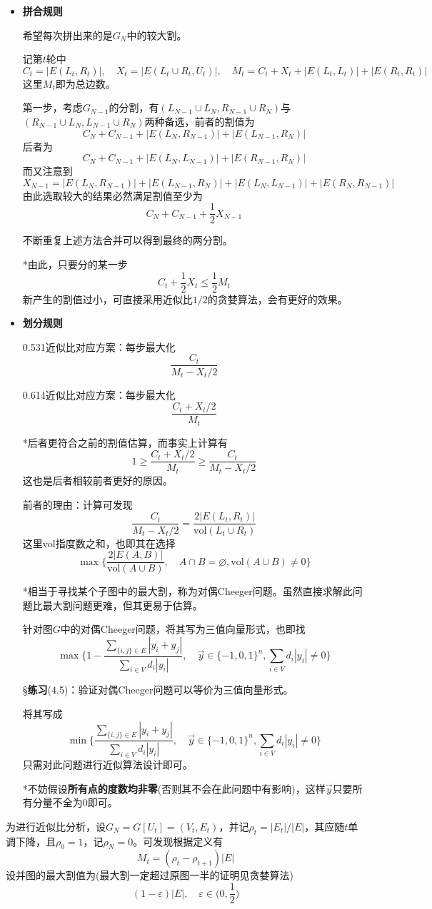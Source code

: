 \documentclass[a4paper,UTF8,fontset=windows]{ctexart}
\newcommand{\exce}[2]{\S\textbf{练习}(#1)：{\kaishu #2}}
\begin{document}
\begin{itemize}
    \item \textbf{拼合规则}
    
    希望每次拼出来的是$G_N$中的较大割。
    
    记第$t$轮中
    $$C_t=|E(L_t,R_t)|,\quad X_t=|E(L_t\cup R_t,U_t)|,\quad M_t=C_t+X_t+|E(L_t,L_t)|+|E(R_t,R_t)|$$
    这里$M_t$即为总边数。

    第一步，考虑$G_{N-1}$的分割，有$(L_{N-1}\cup L_N,R_{N-1}\cup R_N)$与$(R_{N-1}\cup L_N,L_{N-1}\cup R_N)$两种备选，前者的割值为
    $$C_N+C_{N-1}+|E(L_N,R_{N-1})|+|E(L_{N-1},R_N)|$$
    后者为
    $$C_N+C_{N-1}+|E(L_N,L_{N-1})|+|E(R_{N-1},R_N)|$$
    而又注意到
    $$X_{N-1}=|E(L_N,R_{N-1})|+|E(L_{N-1},R_N)|+|E(L_N,L_{N-1})|+|E(R_N,R_{N-1})|$$
    由此选取较大的结果必然满足割值至少为
    $$C_N+C_{N-1}+\frac{1}{2}X_{N-1}$$

    不断重复上述方法合并可以得到最终的两分割。

    *由此，只要分的某一步
    $$C_t+\frac{1}{2}X_t\le\frac{1}{2}M_t$$
    新产生的割值过小，可直接采用近似比$1/2$的贪婪算法，会有更好的效果。

    \item \textbf{划分规则}
    
    0.531近似比对应方案：每步最大化
    $$\frac{C_t}{M_t-X_t/2}$$

    0.614近似比对应方案：每步最大化
    $$\frac{C_t+X_t/2}{M_t}$$

    *后者更符合之前的割值估算，而事实上计算有
    $$1\ge\frac{C_t+X_t/2}{M_t}\ge\frac{C_t}{M_t-X_t/2}$$
    这也是后者相较前者更好的原因。

    前者的理由：计算可发现
    $$\frac{C_t}{M_t-X_t/2}=\frac{2|E(L_t,R_t)|}{\mathrm{vol}(L_t\cup R_t)}$$
    这里vol指度数之和，也即其在选择
    $$\max\bigg\{\frac{2|E(A,B)|}{\mathrm{vol}(A\cup B)},\quad A\cap B=\varnothing,\mathrm{vol}(A\cup B)\ne0\bigg\}$$
    
    *相当于寻找某个子图中的最大割，称为对偶Cheeger问题。虽然直接求解此问题比最大割问题更难，但其更易于估算。

    针对图$G$中的对偶Cheeger问题，将其写为三值向量形式，也即找
    $$\max\bigg\{1-\frac{\sum_{\{i,j\}\in E}|y_i+y_j|}{\sum_{i\in V}d_i|y_i|},\quad\vec{y}\in\{-1,0,1\}^n,\sum_{i\in V}d_i|y_i|\ne0\bigg\}$$

    \exce{4.5}{验证对偶Cheeger问题可以等价为三值向量形式。}

    将其写成
    $$\min\bigg\{\frac{\sum_{\{i,j\}\in E}|y_i+y_j|}{\sum_{i\in V}d_i|y_i|},\quad\vec{y}\in\{-1,0,1\}^n,\sum_{i\in V}d_i|y_i|\ne0\bigg\}$$
    只需对此问题进行近似算法设计即可。

    *不妨假设\textbf{所有点的度数均非零}(否则其不会在此问题中有影响)，这样$\vec{y}$只要所有分量不全为0即可。
\end{itemize}
为进行近似比分析，设$G_N=G[U_t]=(V_t,E_t)$，并记$\rho_t=|E_t|/|E|$，其应随$t$单调下降，且$\rho_0=1$，记$\rho_N=0$。可发现根据定义有
$$M_t=(\rho_t-\rho_{t+1})|E|$$
设并图的最大割值为(最大割一定超过原图一半的证明见贪婪算法)
$$(1-\varepsilon)|E|,\quad\varepsilon\in\bigg(0,\frac{1}{2}\bigg)$$
\end{document}
